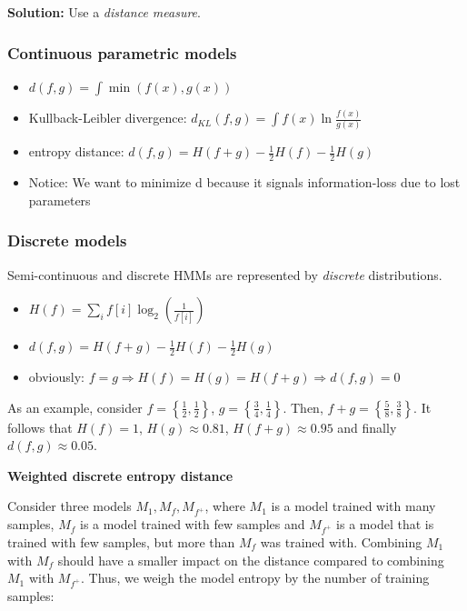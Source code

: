 \vspace{5pt}

\textbf{Solution:} Use a \textit{distance measure}.
\vspace{10pt}

\subsubsection{Continuous parametric models}
\begin{itemize}
    \item $d(f, g) = \int \min(f(x), g(x))$
    \item Kullback-Leibler divergence: $d_{KL}(f, g) = \int f(x) \ln \frac{f(x)}{g(x)}$
    \item entropy distance: $d(f, g) = H(f + g) - \frac{1}{2} H(f) - \frac{1}{2} H(g)$
    \item Notice: We want to minimize d because it signals information-loss due to lost parameters
\end{itemize}

\subsubsection{Discrete models}
Semi-continuous and discrete HMMs are represented by \textit{discrete} distributions.
\begin{itemize}
    \item $H(f) = \sum\limits_i f[i] \log_2(\frac{1}{f[i]})$
    \item $d(f, g) = H(f + g) - \frac{1}{2} H(f) - \frac{1}{2} H(g)$
    \item obviously: $f = g \Rightarrow H(f) = H(g) = H(f + g) \Rightarrow d(f, g) = 0$
\end{itemize}

As an example, consider $f = \left\{\frac{1}{2}, \frac{1}{2} \right\}$, $g = \left\{\frac{3}{4}, \frac{1}{4} \right\}$. Then, $f + g = \left\{\frac{5}{8}, \frac{3}{8} \right\}$. It follows that $H(f) = 1$, $H(g) \approx 0.81$, $H(f + g) \approx 0.95$ and finally $d(f, g) \approx 0.05$.

\vspace{10pt}

\textbf{Weighted discrete entropy distance}

\vspace{5pt}

Consider three models $M_1, M_f, M_{f^+}$, where $M_1$ is a model trained with many samples, $M_f$ is a model trained with few samples and $M_{f^+}$ is a model that is trained with few samples, but more than $M_f$ was trained with. Combining $M_1$ with $M_f$ should have a smaller impact on the distance compared to combining $M_1$ with $M_{f^+}$. Thus, we weigh the model entropy by the number of training samples:

